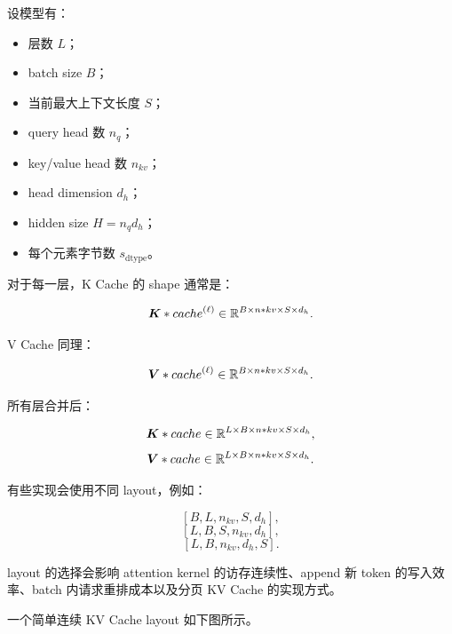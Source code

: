 设模型有：

\begin{itemize}
\item 层数 $L$；
\item batch size $B$；
\item 当前最大上下文长度 $S$；
\item query head 数 $n_q$；
\item key/value head 数 $n_{kv}$；
\item head dimension $d_h$；
\item hidden size $H=n_qd_h$；
\item 每个元素字节数 $s_{\mathrm{dtype}}$。
\end{itemize}

对于每一层，K Cache 的 shape 通常是：

\[
\bm{K}*{cache}^{(\ell)}
\in
\mathbb{R}^{B\times n*{kv}\times S\times d_h}.
\]

V Cache 同理：

\[
\bm{V}*{cache}^{(\ell)}
\in
\mathbb{R}^{B\times n*{kv}\times S\times d_h}.
\]

所有层合并后：

\[
\bm{K}*{cache}
\in
\mathbb{R}^{L\times B\times n*{kv}\times S\times d_h},
\]
\[
\bm{V}*{cache}
\in
\mathbb{R}^{L\times B\times n*{kv}\times S\times d_h}.
\]

有些实现会使用不同 layout，例如：

\[
[B,L,n_{kv},S,d_h],
\]
\[
[L,B,S,n_{kv},d_h],
\]
\[
[L,B,n_{kv},d_h,S].
\]

layout 的选择会影响 attention kernel 的访存连续性、append 新 token 的写入效率、batch 内请求重排成本以及分页 KV Cache 的实现方式。

一个简单连续 KV Cache layout 如下图所示。

